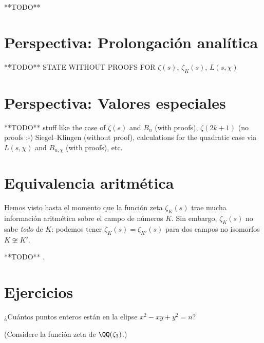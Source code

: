 **TODO**


\section{Perspectiva: Prolongación analítica}

**TODO** STATE WITHOUT PROOFS FOR $\zeta (s)$, $\zeta_K (s)$, $L (s,\chi)$


\section{Perspectiva: Valores especiales}

**TODO**
stuff like
the case of $\zeta (s)$ and $B_n$ (with proofs),
$\zeta (2k+1)$ (no proofs :-)
Siegel--Klingen (without proof),
calculations for the quadratic case via $L (s,\chi)$ and $B_{n,\chi}$ (with proofs),
etc.


\section{Equivalencia aritmética}

Hemos visto hasta el momento que la función zeta $\zeta_K (s)$ trae mucha
información aritmética sobre el campo de números $K$. Sin embargo, $\zeta_K (s)$
no sabe \emph{todo} de $K$: podemos tener $\zeta_K (s) = \zeta_{K'} (s)$ para
dos campos no isomorfos $K \not\cong K'$.

**TODO** \cite{Perlis-1977}.


\pagebreak


\section*{Ejercicios}

\begin{ejercicio}
  ¿Cuántos puntos enteros están en la elipse $x^2 - xy + y^2 = n$?

  \noindent (Considere la función zeta de $\QQ (\zeta_3)$.)
\end{ejercicio}

